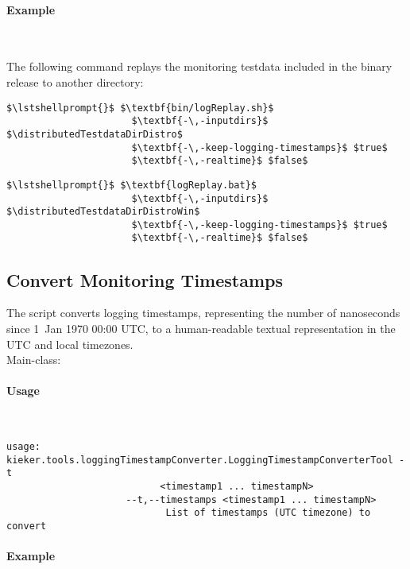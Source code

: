 			\paragraph*{Example}\

				\noindent The following command replays the monitoring testdata included in the binary release to another directory:

				\setTextListing
				\begin{lstlisting}[gobble = 10, caption=Execution under UNIX-like systems]
					$\lstshellprompt{}$ $\textbf{bin/logReplay.sh}$
					  $\textbf{-\,-inputdirs}$ $\distributedTestdataDirDistro$ 
					  $\textbf{-\,-keep-logging-timestamps}$ $true$ 
					  $\textbf{-\,-realtime}$ $false$
				\end{lstlisting}
				\begin{lstlisting}[gobble = 10, caption=Execution under Windows]
					$\lstshellprompt{}$ $\textbf{logReplay.bat}$
					  $\textbf{-\,-inputdirs}$ $\distributedTestdataDirDistroWin$ 
					  $\textbf{-\,-keep-logging-timestamps}$ $true$ 
					  $\textbf{-\,-realtime}$ $false$
				\end{lstlisting}
		
		\subsection{Convert Monitoring Timestamps}
		
			The script converts \KiekerMonitoringPart{} logging timestamps, representing the number of nanoseconds since 1~Jan 1970 00:00 UTC, to a human-readable textual representation in the UTC and local timezones.\\
			
			\noindent Main-class: {\small {}}

			\paragraph*{Usage}\

				\setTextListing
				\begin{lstlisting}[gobble = 10]
					usage: kieker.tools.loggingTimestampConverter.LoggingTimestampConverterTool -t
						   <timestamp1 ... timestampN>
					 --t,--timestamps <timestamp1 ... timestampN>
							List of timestamps (UTC timezone) to convert
				\end{lstlisting}

			\paragraph*{Example}\

